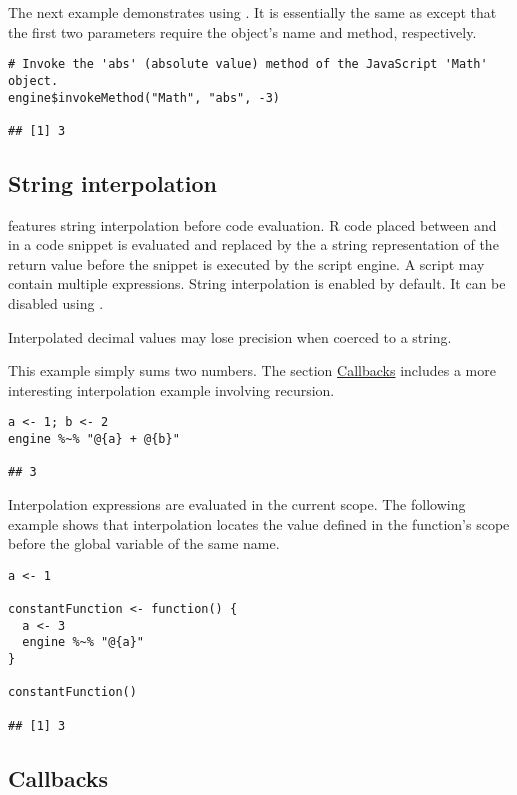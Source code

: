 The next example demonstrates using . It is essentially the same as  except that the first two parameters require the object's name and method, respectively.

\begin{verbatim}
# Invoke the 'abs' (absolute value) method of the JavaScript 'Math' object.
engine$invokeMethod("Math", "abs", -3)

## [1] 3
\end{verbatim}

\hypertarget{stringinterpolation}{\subsection{String interpolation}}

 features string interpolation before code evaluation. R code placed between  and \code{\}} in a code snippet is evaluated and replaced by the a string representation of the return value before the snippet is executed by the script engine. A script may contain multiple  expressions. String interpolation is enabled by default. It can be disabled using .

 Interpolated decimal values may lose precision when coerced to a string.

This example simply sums two numbers. The section \hyperlink{callbacks}{Callbacks} includes a more interesting interpolation example involving recursion.

\begin{verbatim}
a <- 1; b <- 2
engine %~% "@{a} + @{b}"

## 3
\end{verbatim}

Interpolation expressions are evaluated in the current scope. The following example shows that interpolation locates the value defined in the function's scope before the global variable of the same name.

\begin{verbatim}
a <- 1

constantFunction <- function() {
  a <- 3
  engine %~% "@{a}"
}

constantFunction()

## [1] 3
\end{verbatim}

\hypertarget{callbacks}{\subsection{Callbacks}}

